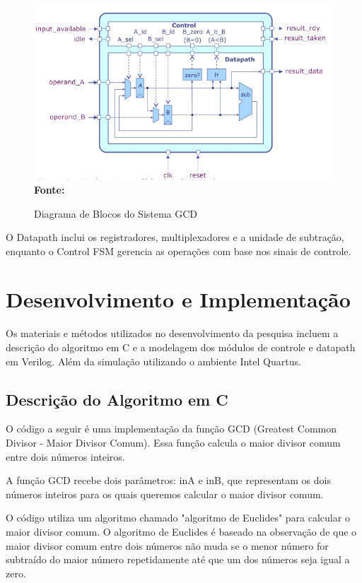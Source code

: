 \documentclass[a4paper,11pt]{article} %
\begin{document}
\begin{figure}[ht]
    \centering
    \caption{Diagrama de Blocos do Sistema GCD}
    \includegraphics[width=17cm,angle=0]{imgs/diagram_block_control_datapath.png}
    \\\textbf{Fonte:} \cite{cse_taylor_michael}
    \label{fig:diagram_block}
\end{figure}

O Datapath inclui os registradores, multiplexadores e a unidade de subtração, 
enquanto o Control FSM gerencia as operações com base nos sinais de controle.

\clearpage
\section{Desenvolvimento e Implementação}

Os materiais e métodos utilizados no desenvolvimento da pesquisa 
incluem a descrição do algoritmo em C e
a modelagem dos módulos de controle e datapath em Verilog.
Além da simulação utilizando o ambiente Intel Quartus.

\subsection{Descrição do Algoritmo em C}

O código a seguir é uma implementação da função GCD (Greatest Common Divisor - Maior Divisor Comum). 
Essa função calcula o maior divisor comum entre dois números inteiros.

A função GCD recebe dois parâmetros: inA e inB, 
que representam os dois números inteiros para os quais 
queremos calcular o maior divisor comum.

O código utiliza um algoritmo chamado "algoritmo de Euclides" 
para calcular o maior divisor comum. 
O algoritmo de Euclides é baseado na observação de que 
o maior divisor comum entre dois números não muda 
se o menor número for subtraído do maior número repetidamente 
até que um dos números seja igual a zero.
\end{document}

